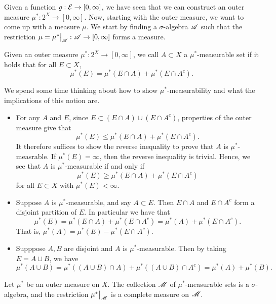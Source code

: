 \documentclass[12pt]{article} %
\begin{document}
Given a function $\varrho: \mathcal{E} \to [0,\infty]$, we have seen that we can construct an outer measure $\mu^* : 2^X \to [0,\infty]$. Now, starting with the outer measure, we want to come up with a measure $\mu$. We start by finding a $\sigma$-algebra $\mathscr{A}$ such that the restriction $\mu = \restr{\mu^*}{\SA} : \SA \to [0,\infty]$ forms a measure.

\begin{definition}[$\mu^*$-measurability]
    Given an outer measure $\mu^* : 2^X \to [0,\infty]$, we call $A \subset X$ a $\mu^*$-measurable set if it holds that for all $E \subset X$, \[\mu^*(E) = \mu^*(E \cap A) + \mu^*(E \cap A^c).\]
\end{definition}

\begin{remark}
    We spend some time thinking about how to show $\mu^*$-measurability and what the implications of this notion are.
    \begin{itemize}
        \item For any $A$ and $E$, since $E \subset (E \cap A) \cup (E \cap A^c)$, properties of the outer measure give that \[\mu^*(E) \leq \mu^*(E \cap A) + \mu^*(E \cap A^c).\] It therefore suffices to show the reverse inequality to prove that $A$ is $\mu^*$-measrable. If $\mu^*(E) = \infty$, then the reverse inequality is trivial. Hence, we see that $A$ is $\mu^*$-measurable if and only if \[\mu^*(E) \geq \mu^*(E \cap A) + \mu^*(E \cap A^c)\] for all $E \subset X$ with $\mu^*(E) < \infty$.
        \item Suppose $A$ is $\mu^*$-measurable, and say $A \subset E$. Then $E \cap A$ and $E \cap A^c$ form a disjoint partition of $E$. In particular we have that \[\mu^*(E) = \mu^*(E \cap A) + \mu^*(E \cap A^c) = \mu^*(A) + \mu^*(E \cap A^c).\] That is, $\mu^*(A) = \mu^*(E) - \mu^*(E  \cap A^c)$.
        \item Supppose $A, B$ are disjoint and $A$ is $\mu^*$-measurable. Then by taking $E = A \sqcup B$, we have \[\mu^*(A \cup B) = \mu^*((A \cup B) \cap A) + \mu^*((A \cup B) \cap A^c) = \mu^*(A) + \mu^*(B).\]
    \end{itemize}
\end{remark}

\begin{theorem}[Caratheodory]
    Let $\mu^*$ be an outer measure on $X$. The collection $\mathscr{M}$ of $\mu^*$-measurable sets is a $\sigma$-algebra, and the restriction $\restr{\mu^*}{\SM}$ is a complete measure on $\mathscr{M}$.
\end{theorem}
\end{document}
